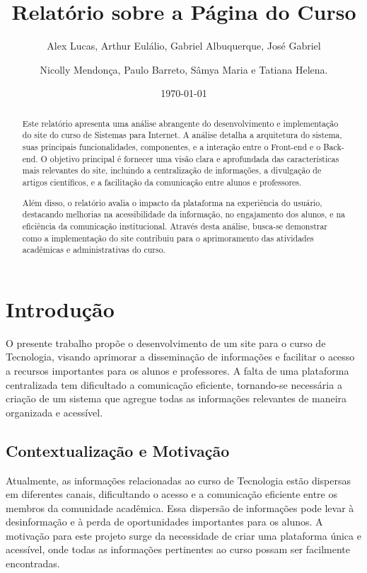 \documentclass[a4paper,12pt]{report}
\title{Relatório sobre a Página do Curso}
\author{
    Alex Lucas, Arthur Eulálio, Gabriel Albuquerque, José Gabriel \and
    Nicolly Mendonça, Paulo Barreto, Sâmya Maria e Tatiana Helena.
}
\date{\today}
\begin{document}
\maketitle

\begin{abstract}
Este relatório apresenta uma análise abrangente do desenvolvimento e implementação do site do curso de Sistemas para Internet. A análise detalha a arquitetura do sistema, suas principais funcionalidades, componentes, e a interação entre o Front-end e o Back-end. O objetivo principal é fornecer uma visão clara e aprofundada das características mais relevantes do site, incluindo a centralização de informações, a divulgação de artigos científicos, e a facilitação da comunicação entre alunos e professores.  
 
Além disso, o relatório avalia o impacto da plataforma na experiência do usuário, destacando melhorias na acessibilidade da informação, no engajamento dos alunos, e na eficiência da comunicação institucional. Através desta análise, busca-se demonstrar como a implementação do site contribuiu para o aprimoramento das atividades acadêmicas e administrativas do curso. 
\end{abstract}

\tableofcontents
\newpage

\chapter{Introdução}
O presente trabalho propõe o desenvolvimento de um site para o curso de Tecnologia, visando aprimorar a disseminação de informações e facilitar o acesso a recursos importantes para os alunos e professores. A falta de uma plataforma centralizada tem dificultado a comunicação eficiente, tornando-se necessária a criação de um sistema que agregue todas as informações relevantes de maneira organizada e acessível.

\section{Contextualização e Motivação}
Atualmente, as informações relacionadas ao curso de Tecnologia estão dispersas em diferentes canais, dificultando o acesso e a comunicação eficiente entre os membros da comunidade acadêmica. Essa dispersão de informações pode levar à desinformação e à perda de oportunidades importantes para os alunos. A motivação para este projeto surge da necessidade de criar uma plataforma única e acessível, onde todas as informações pertinentes ao curso possam ser facilmente encontradas.
\end{document}
